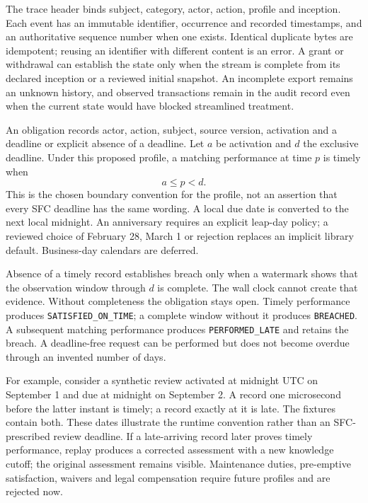 The trace header binds subject, category, actor, action, profile and inception.
Each event has an immutable identifier, occurrence and recorded timestamps, and
an authoritative sequence number when one exists. Identical duplicate bytes are
idempotent; reusing an identifier with different content is an error. A grant or
withdrawal can establish the state only when the stream is complete from its
declared inception or a reviewed initial snapshot. An incomplete export remains
an unknown history, and observed transactions remain in the audit record even
when the current state would have blocked streamlined treatment.


An obligation records actor, action, subject, source version, activation and a
deadline or explicit absence of a deadline. Let $a$ be activation and $d$ the
exclusive deadline. Under this proposed profile, a matching performance at time
$p$ is timely when
\begin{equation}
 a\leq p<d.
 \label{eq:timely}
\end{equation}
This is the chosen boundary convention for the profile, not an assertion that
every SFC deadline has the same wording. A local due date is converted to the
next local midnight. An anniversary requires an explicit leap-day policy; a
reviewed choice of February 28, March 1 or rejection replaces an implicit library
default. Business-day calendars are deferred.

Absence of a timely record establishes breach only when a watermark shows that
the observation window through $d$ is complete. The wall clock cannot create
that evidence. Without completeness the obligation stays open. Timely performance
produces \texttt{SATISFIED\_ON\_TIME}; a complete window without it produces
\texttt{BREACHED}. A subsequent matching performance produces
\texttt{PERFORMED\_LATE} and retains the breach. A deadline-free request can be
performed but does not become overdue through an invented number of days.

For example, consider a synthetic review activated at midnight UTC on September
1 and due at midnight on September 2. A record one microsecond before the latter
instant is timely; a record exactly at it is late. The fixtures contain both.
These dates illustrate the runtime convention rather than an SFC-prescribed
review deadline. If a late-arriving record later proves timely performance,
replay produces a corrected assessment with a new knowledge cutoff; the original
assessment remains visible. Maintenance duties, pre-emptive satisfaction,
waivers and legal compensation require future profiles and are rejected now.

